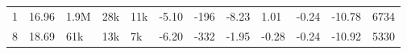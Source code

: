 \begin{table}[ht]
\begin{tabularx}{\textwidth}{@{} r *{10}{X} r @{}}
        \footnotesize 1 & 
        \cellcolor[HTML]{DDF1E7}\footnotesize 16.96 & 
        \cellcolor[HTML]{EEF8F3}\footnotesize 1.9M & 
        \cellcolor[HTML]{FEFFFE}\footnotesize 28k & 
        \cellcolor[HTML]{FFFFFF}\footnotesize 11k & 
        \cellcolor[HTML]{DCF1E7}\footnotesize -5.10 & 
        \cellcolor[HTML]{DBF1E6}\footnotesize -196 & 
        \cellcolor[HTML]{FFFFFF}\footnotesize -8.23 & 
        \footnotesize 1.01 & 
        \cellcolor[HTML]{ACDEC5}\footnotesize -0.24 & 
        \cellcolor[HTML]{F1FAF5}\footnotesize -10.78 & 
        \footnotesize 6734 \\

        \footnotesize 8 & 
        \cellcolor[HTML]{F7FBF9}\footnotesize 18.69 & 
        \cellcolor[HTML]{FFFFFF}\footnotesize 61k & 
        \cellcolor[HTML]{FFFFFF}\footnotesize 13k & 
        \cellcolor[HTML]{FFFFFF}\footnotesize 7k & 
        \cellcolor[HTML]{FBFEFD}\footnotesize -6.20 & 
        \cellcolor[HTML]{FDFEFE}\footnotesize -332 & 
        \cellcolor[HTML]{E2F4EB}\footnotesize -1.95 & 
        \footnotesize -0.28 & 
        \cellcolor[HTML]{ACDEC5}\footnotesize -0.24 & 
        \cellcolor[HTML]{F3FBF7}\footnotesize -10.92 & 
        \footnotesize 5330 \\
        \bottomrule
    \end{tabularx}
\end{table}